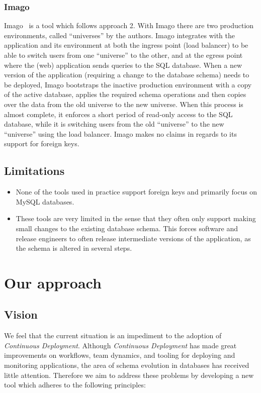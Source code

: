 \documentclass[conference]{IEEEtran}
\begin{document}
\subsubsection{Imago}
Imago~\cite{Dumitras:2009:WUF:1656980.1657005} is a tool which follows approach 2. With Imago there are two production environments, called ``universes'' by the authors. Imago integrates with the application and its environment at both the ingress point (load balancer) to be able to switch users from one ``universe'' to the other, and at the egress point where the (web) application sends queries to the SQL database. When a new version of the application (requiring a change to the database schema) needs to be deployed, Imago bootstraps the inactive production environment with a copy of the active database, applies the required schema operations and then copies over the data from the old universe to the new universe. When this process is almost complete, it enforces a short period of read-only access to the SQL database, while it is switching users from the old ``universe'' to the new ``universe'' using the load balancer. Imago makes no claims in regards to its support for foreign keys.

\subsection{Limitations} 

\begin{itemize}
  \item{None of the tools used in practice support foreign keys and primarily focus on MySQL databases.}
  \item{These tools are very limited in the sense that they often only support making small changes to the existing database schema. This forces software and release engineers to often release intermediate versions of the application, as the schema is altered in several steps.}
\end{itemize}

\section{Our approach} %

\subsection{Vision}

We feel that the current situation is an impediment to the adoption of \textit{Continuous Deployment}. Although \textit{Continuous Deployment} has made great improvements on workflows, team dynamics, and tooling for deploying and monitoring applications, the area of schema evolution in databases has received little attention. Therefore we aim to address these problems by developing a new tool which adheres to the following principles:
\end{document}
